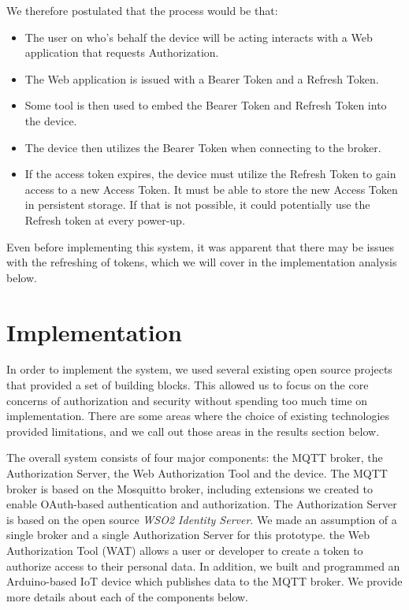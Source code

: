\documentclass{llncs}
\begin{document}
We therefore postulated that the process would be that:
\begin{itemize} 
\item The user on who's behalf the device will be acting interacts with a Web application that 
requests Authorization. 
\item The Web application is issued with a Bearer Token and a Refresh Token. 
\item Some tool is then used to embed the Bearer Token and Refresh Token into the device.
\item The device then utilizes the Bearer Token when connecting to the broker.
\item If the access token expires, the device must utilize the Refresh Token to gain access 
to a new Access Token. It must be able to store the new Access Token in persistent storage. If that is not
possible, it could potentially use the Refresh token at every power-up.
\end{itemize}

Even before implementing this system, it was apparent that there may be issues with the refreshing of
tokens, which we will cover in the implementation analysis below.
\fi

\section{Implementation}\label{sect:imp}
In order to implement the system, we used several existing open source projects that provided a 
set of building blocks. This allowed us to focus on the core concerns of authorization and security
without spending too much time on implementation. There are some areas where the choice of 
existing technologies provided limitations, and we call out those areas in the results section below.

The overall system consists of four major components: the MQTT broker, the Authorization Server, the Web Authorization Tool and the device. The MQTT broker is based on the Mosquitto broker, including extensions we created to enable
OAuth-based authentication and authorization.
The Authorization Server is based on the open source \emph{WSO2 Identity Server}.
We made an assumption of a single broker and a single Authorization Server for this prototype.
the Web Authorization Tool (WAT) allows a user or developer
to create a token to authorize access to their personal data.
In addition, we built and programmed an Arduino-based IoT device which publishes data to the MQTT broker.  We provide more details about each of the components below.
\end{document}
